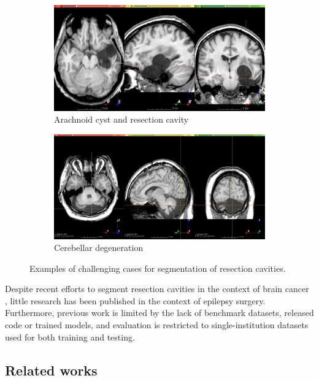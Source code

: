 \begin{figure}
  \begin{subfigure}{0.49\textwidth}
    \centering
    \includegraphics[width=\linewidth]{figures/hard_7}
    \caption{Arachnoid cyst and resection cavity}
    \label{fig:hard_sub_7}
  \end{subfigure}
  \hfill
  \begin{subfigure}{0.49\textwidth}
    \centering
    \includegraphics[width=\linewidth]{figures/hard_8}
    \caption{Cerebellar degeneration}
    \label{fig:hard_sub_8}
  \end{subfigure}

  \caption{
    Examples of challenging cases for segmentation of resection cavities.
  }
  \label{fig:hard_resections}
\end{figure}

Despite recent efforts to segment resection cavities in the context of brain cancer \cite{meier_automatic_2017,ermis_fully_2020}, little research has been published in the context of epilepsy surgery.
Furthermore, previous work is limited by the lack of benchmark datasets, released code or trained models, and evaluation is restricted to single-institution datasets used for both training and testing.


\subsection{Related works}

